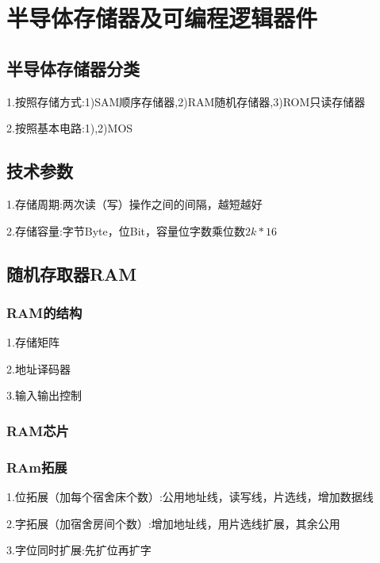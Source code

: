 \documentclass[11pt,twoside,a4paper]{ctexart}
\begin{document}
    
\section{半导体存储器及可编程逻辑器件}

\subsection{半导体存储器分类}

1.按照存储方式:1)SAM顺序存储器,2)RAM随机存储器,3)ROM只读存储器

2.按照基本电路:1),2)MOS

\subsection{技术参数}

1.存储周期:两次读（写）操作之间的间隔，越短越好

2.存储容量:字节Byte，位Bit，容量位字数乘位数$2k*16$

\subsection{随机存取器RAM}

\subsubsection{RAM的结构}

1.存储矩阵

2.地址译码器

3.输入输出控制

\subsubsection{RAM芯片}

\subsubsection{RAm拓展}

1.位拓展（加每个宿舍床个数）:公用地址线，读写线，片选线，增加数据线

2.字拓展（加宿舍房间个数）:增加地址线，用片选线扩展，其余公用

3.字位同时扩展:先扩位再扩字
\end{document}
